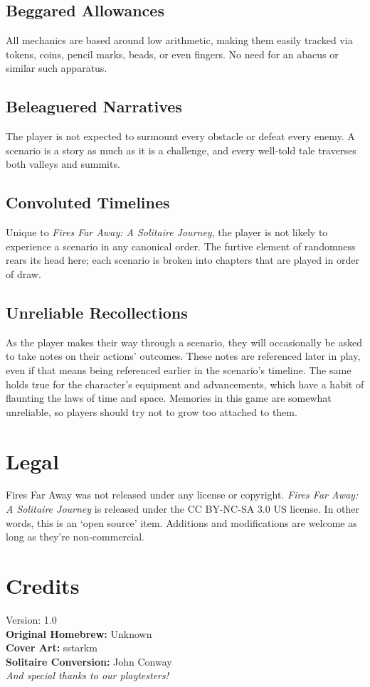 \documentclass[12pt]{article}
\begin{document}
\begin{multicols*}{2}
\subsection*{Beggared Allowances}
All mechanics are based around low arithmetic, making them easily tracked via tokens, coins, pencil marks, beads, or even fingers. No need for an abacus or similar such apparatus.

\subsection*{Beleaguered Narratives}
The player is not expected to surmount every obstacle or defeat every enemy. A scenario is a story as much as it is a challenge, and every well-told tale traverses both valleys and summits.

\subsection*{Convoluted Timelines}
Unique to \emph{Fires Far Away: A Solitaire Journey}, the player is not likely to experience a scenario in any canonical order. The furtive element of randomness rears its head here; each scenario is broken into chapters that are played in order of draw.

\subsection*{Unreliable Recollections}
As the player makes their way through a scenario, they will occasionally be asked to take notes on their actions’ outcomes. These notes are referenced later in play, even if that means being referenced earlier in the scenario’s timeline. The same holds true for the character’s equipment and advancements, which have a habit of flaunting the laws of time and space. Memories in this game are somewhat unreliable, so players should try not to grow too attached to them.

\vfill

\section*{Legal}
Fires Far Away was not released under any license or copyright. \emph{Fires Far Away: A Solitaire Journey} is released under the CC BY-NC-SA 3.0 US license. In other words, this is an ‘open source’ item. Additions and modifications are welcome as long as they’re non-commercial.

\section*{Credits}
Version: 1.0\\
\textbf{Original Homebrew:} Unknown\\
\textbf{Cover Art:} sstarkm\\
\textbf{Solitaire Conversion:} John Conway\\
\emph{And special thanks to our playtesters!}


\end{multicols*}
\end{document}
